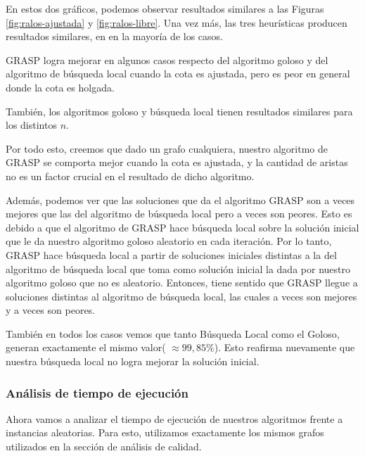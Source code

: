 En estos dos gráficos, podemos observar resultados similares a las Figuras \ref{fig:ralos-ajustada} y \ref{fig:ralos-libre}. Una vez más, las tres heurísticas producen resultados similares, en en la mayoría de los casos.

GRASP logra mejorar en algunos casos respecto del algoritmo goloso y del algoritmo de búsqueda local cuando la cota es ajustada, pero es peor en general donde la cota es holgada.

También, los algoritmos goloso y búsqueda local tienen resultados similares para los distintos $n$.

Por todo esto, creemos que dado un grafo cualquiera, nuestro algoritmo de GRASP se comporta mejor cuando la cota es ajustada, y la cantidad de aristas no es un factor crucial en el resultado de dicho algoritmo.

Además, podemos ver que las soluciones que da el algoritmo GRASP son a veces mejores que las del algoritmo de búsqueda local pero a veces son peores. Esto es debido a que el algoritmo de GRASP hace búsqueda local sobre la solución inicial que le da nuestro algoritmo goloso aleatorio en cada iteración. Por lo tanto, GRASP hace búsqueda local a partir de soluciones iniciales distintas a la del algoritmo de búsqueda local que toma como solución inicial la dada por nuestro algoritmo goloso que no es aleatorio. Entonces, tiene sentido que GRASP llegue a soluciones distintas al algoritmo de búsqueda local, las cuales a veces son mejores y a veces son peores.

También en todos los casos vemos que tanto Búsqueda Local como el Goloso, generan exactamente el mismo valor( $ \approx 99,85 \% $). Esto reafirma nuevamente que nuestra búsqueda local no logra mejorar la solución inicial.  

\subsubsection{Análisis de tiempo de ejecución}

Ahora vamos a analizar el tiempo de ejecución de nuestros algoritmos frente a instancias aleatorias. Para esto, utilizamos exactamente los mismos grafos utilizados en la sección de análisis de calidad.

